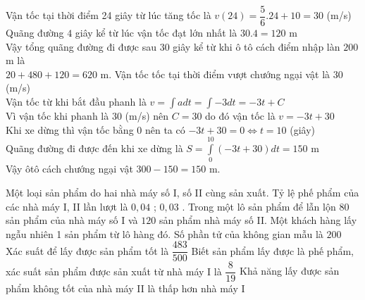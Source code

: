 \begin{ex}
{\begin{itemchoice}
			Vận tốc tại thời điểm 24 giây từ lúc tăng tốc là $v\left(24\right)=\dfrac{5}{6}.24+10=30$ (m/s)\\
			Quãng đường $4$ giây kể từ lúc vận tốc đạt lớn nhất là $30.4=120$ m\\
			Vậy tổng quãng đường đi được sau $30$ giây kể từ khi ô tô cách điểm nhập làn $200$ m là\\
			$20+480+120=620$ m.
			\itemch Vận tốc tốc tại thời điểm vượt chướng ngại vật là $30$ (m/s)\\
			Vận tốc từ khi bắt đầu phanh là $v=\displaystyle\int a dt=\displaystyle\int -3dt=-3t+C$\\
			Vì vận tốc khi phanh là $30$ (m/s) nên $C=30$ do đó vận tốc là $v=-3t+30$\\
			Khi xe dừng thì vận tốc bằng $0$ nên ta có $-3t+30=0\Leftrightarrow t=10$ (giây)\\
			Quãng đường đi được đến khi xe dừng là $S=\displaystyle\int\limits_0^{10}{\left(-3t+30\right)dt}=150$ m\\
			Vậy ôtô cách chướng ngại vật $300-150=150$ m.
		\end{itemchoice}
	}
\end{ex}

\begin{ex}%
	Một loại sản phẩm do hai nhà máy số I, số II cùng sản xuất. Tỷ lệ phế phẩm của các nhà máy I, II lần lượt là $0,04$ ; $0,03$ . Trong một lô sản phẩm để lẫn lộn $80$ sản phẩm của nhà máy số I và $120$ sản phẩm nhà máy số II. Một khách hàng lấy ngẫu nhiên 1 sản phẩm từ lô hàng đó.
	\choiceTF
	{\True Số phần tử của không gian mẫu là $200$}
	{\True Xác suất để lấy được sản phẩm tốt là $\dfrac{483}{500}$}
	{Biết sản phẩm lấy được là phế phẩm, xác suất sản phẩm được sản xuất từ nhà máy I là $\dfrac{8}{19}$}
	{Khả năng lấy được sản phẩm không tốt của nhà máy II là thấp hơn nhà máy I}
\end{ex}

